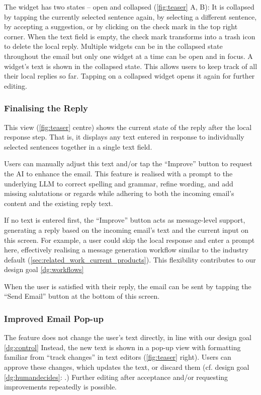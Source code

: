 The widget has two states -- open and collapsed (\cref{fig:teaser} A, B): 
It is collapsed by tapping the currently selected sentence again, by selecting a different sentence, by accepting a suggestion, or by clicking on the check mark in the top right corner. When the text field is empty, the check mark transforms into a trash icon to delete the local reply. Multiple widgets can be in the collapsed state throughout the email but only one widget at a time can be open and in focus. %
A widget's text is shown in the collapsed state. This allows users to keep track of all their local replies so far. Tapping on a collapsed widget opens it again for further editing. 






\subsubsection{Finalising the Reply}\label{sec:impl_finalize}
This view  (\cref{fig:teaser} centre) shows the current state of the reply after the local response step. That is, it displays any text entered in response to individually selected sentences together in a single text field.

Users can manually adjust this text and/or tap the ``Improve'' button to request the AI to enhance the email. 
This \imppass{} feature is realised with a prompt  to the underlying LLM to correct spelling and grammar, refine wording, and add missing salutations or regards while adhering to both the incoming email's content and the existing reply text. 

If no text is entered first, the ``Improve'' button acts as message-level support, generating a reply based on the incoming email's text and the current input on this screen. For example, a user could skip the local response and enter a prompt here, effectively realising a message generation workflow similar to the industry default (\cref{sec:related_work_current_products}). This flexibility contributes to our design goal \ref{dg:workflows} 

When the user is satisfied with their reply, the email can be sent by tapping the ``Send Email'' button at the bottom of this screen.


\subsubsection{Improved Email Pop-up}\label{sec:impl_imppass}
The \imppass{} feature does not change the user's text directly, in line with our design goal \ref{dg:control} 
Instead, the new text is shown in a pop-up view with formatting familiar from ``track changes'' in text editors (\cref{fig:teaser} right). 
Users can approve these changes, which updates the text, or discard them (cf. design goal \ref{dg:humandecides}: .) Further editing after acceptance and/or requesting improvements repeatedly is possible. 



